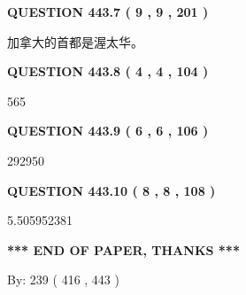 \documentclass{ctexart}
\begin{document}
{\textbf{\Large{QUESTION
443.7 
 ( 9 , 9 , 201 )
}}}
  
  
 
 
\noindent{}
 
 
加拿大的首都是渥太华。
 
 
 
 
  
\vspace{0.2in}
  
{\textbf{\Large{QUESTION
443.8 
 ( 4 , 4 , 104 )
}}}
  
  
 
 
\noindent{}

565
 
 
  
\vspace{0.2in}
  
{\textbf{\Large{QUESTION
443.9 
 ( 6 , 6 , 106 )
}}}
  
  
 
 
\noindent{}

292950
 
 
  
\vspace{0.2in}
  
{\textbf{\Large{QUESTION
443.10 
 ( 8 , 8 , 108 )
}}}
  
  
 
 
\noindent{}

5.505952381
 
 
   
   
 \vspace{0.2in}
 
   
   
   
   
\vspace{1.0in} 
{\textbf{\large{ *** END OF PAPER, THANKS *** }}} 
   
   
\hspace{1.0in} By: 
 239 ( 416 ,  443 )
   
   
   
\vspace{0.2in}
\vspace{0.2in}
   
   
 \newpage
\setcounter{page}{1} 
   
\end{document}
